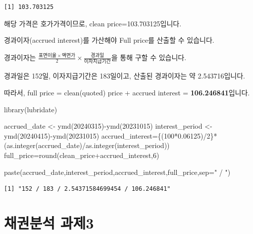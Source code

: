 \documentclass[
  letterpaper,
  DIV=11,
  numbers=noendperiod]{scrreprt}
\newenvironment{Shaded}{\begin{snugshade}}{\end{snugshade}}
\newcommand{\AttributeTok}[1]{\textcolor[rgb]{0.40,0.45,0.13}{#1}}
\newcommand{\DecValTok}[1]{\textcolor[rgb]{0.68,0.00,0.00}{#1}}
\newcommand{\FloatTok}[1]{\textcolor[rgb]{0.68,0.00,0.00}{#1}}
\newcommand{\FunctionTok}[1]{\textcolor[rgb]{0.28,0.35,0.67}{#1}}
\newcommand{\NormalTok}[1]{\textcolor[rgb]{0.00,0.23,0.31}{#1}}
\newcommand{\OtherTok}[1]{\textcolor[rgb]{0.00,0.23,0.31}{#1}}
\newcommand{\SpecialCharTok}[1]{\textcolor[rgb]{0.37,0.37,0.37}{#1}}
\newcommand{\StringTok}[1]{\textcolor[rgb]{0.13,0.47,0.30}{#1}}
\begin{document}
\begin{verbatim}
[1] 103.703125
\end{verbatim}

해당 가격은 호가가격이므로, clean price=103.703125입니다.

경과이자(accrued interest)를 가산해야 Full price를 산출할 수 있습니다.

경과이자는
\(\frac{표면이율 \times 액면가}{2}\times \frac{경과일}{이자지급기간}\)을
통해 구할 수 있습니다.

경과일은 152일, 이자지급기간은 183일이고, 산출된 경과이자는 약
2.543716입니다.

따라서, full price = clean(quoted) price + accrued interest =
\textbf{106.246841}입니다.

\begin{Shaded}
\begin{Highlighting}[]
\FunctionTok{library}\NormalTok{(lubridate)}

\NormalTok{accrued\_date }\OtherTok{\textless{}{-}} \FunctionTok{ymd}\NormalTok{(}\DecValTok{20240315}\NormalTok{)}\SpecialCharTok{{-}}\FunctionTok{ymd}\NormalTok{(}\DecValTok{20231015}\NormalTok{)}
\NormalTok{interest\_period }\OtherTok{\textless{}{-}} \FunctionTok{ymd}\NormalTok{(}\DecValTok{20240415}\NormalTok{)}\SpecialCharTok{{-}}\FunctionTok{ymd}\NormalTok{(}\DecValTok{20231015}\NormalTok{)}
\NormalTok{accrued\_interest}\OtherTok{=}\NormalTok{\{(}\DecValTok{100}\SpecialCharTok{*}\FloatTok{0.06125}\NormalTok{)}\SpecialCharTok{/}\DecValTok{2}\NormalTok{\}}\SpecialCharTok{*}\NormalTok{(}\FunctionTok{as.integer}\NormalTok{(accrued\_date)}\SpecialCharTok{/}\FunctionTok{as.integer}\NormalTok{(interest\_period))}
\NormalTok{full\_price}\OtherTok{=}\FunctionTok{round}\NormalTok{(clean\_price}\SpecialCharTok{+}\NormalTok{accrued\_interest,}\DecValTok{6}\NormalTok{)}

\FunctionTok{paste}\NormalTok{(accrued\_date,interest\_period,accrued\_interest,full\_price,}\AttributeTok{sep=}\StringTok{" / "}\NormalTok{)}
\end{Highlighting}
\end{Shaded}

\begin{verbatim}
[1] "152 / 183 / 2.54371584699454 / 106.246841"
\end{verbatim}

\chapter*{채권분석 과제3}\label{uxcc44uxad8cuxbd84uxc11d-uxacfcuxc81c3}
\end{document}
